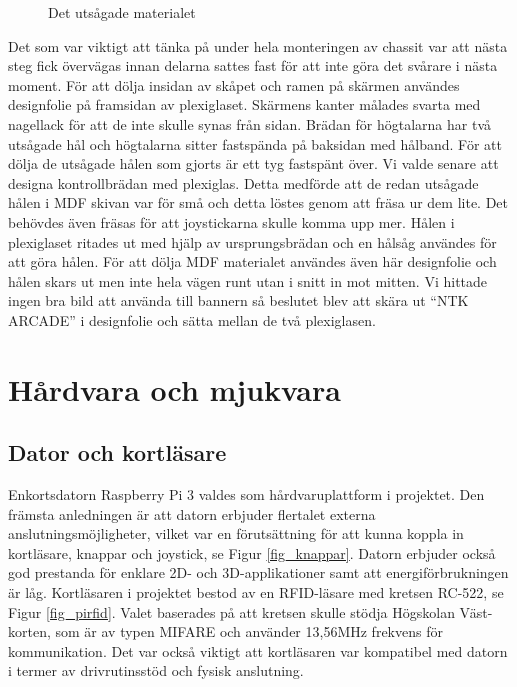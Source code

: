 \documentclass[12pt,fleqn,openany]{book} %
\begin{document}
\begin{wrapfigure}{R}{0.35\textwidth}
  \begin{center}
  \end{center}
  \vspace*{-0.6cm}
  \caption{Det utsågade materialet}
  \label{fig_material}
\end{wrapfigure}
\newpage
Det som var viktigt att tänka på under hela monteringen av chassit var att nästa steg fick övervägas innan delarna sattes fast 
för att inte göra det svårare i nästa moment. För att dölja insidan av skåpet och ramen på skärmen användes designfolie på framsidan 
av plexiglaset. Skärmens kanter målades svarta med nagellack för att de inte skulle synas från sidan. Brädan för högtalarna har två
utsågade hål och högtalarna sitter fastspända på baksidan med hålband. För att dölja de utsågade hålen som gjorts är ett tyg fastspänt
över. Vi valde senare att designa kontrollbrädan med plexiglas. Detta medförde att de redan utsågade hålen i MDF skivan var för små 
och detta löstes genom att fräsa ur dem lite. Det behövdes även fräsas för att joystickarna skulle komma upp mer. Hålen i plexiglaset
ritades ut med hjälp av ursprungsbrädan och en hålsåg användes för att göra hålen. För att dölja MDF materialet användes även här 
designfolie och hålen skars ut men inte hela vägen runt utan i snitt in mot mitten. Vi hittade ingen bra bild att använda till bannern 
så beslutet blev att skära ut “NTK ARCADE” i designfolie och sätta mellan de två plexiglasen.

\section{Hårdvara och mjukvara}
\subsection{Dator och kortläsare}
Enkortsdatorn Raspberry Pi 3 valdes som hårdvaruplattform i projektet. Den främsta anledningen är att datorn erbjuder flertalet
externa anslutningsmöjligheter, vilket var en förutsättning för att kunna koppla in kortläsare, knappar och joystick, se Figur \ref{fig_knappar}. Datorn 
erbjuder också god prestanda för enklare 2D- och 3D-applikationer samt att energiförbrukningen är låg. Kortläsaren i projektet 
bestod av en RFID-läsare med kretsen RC-522, se Figur \ref{fig_pirfid}. Valet baserades på att kretsen skulle stödja Högskolan Väst-korten, som är av typen 
MIFARE och använder 13,56MHz frekvens för kommunikation. Det var också viktigt att kortläsaren var kompatibel med datorn i termer 
av drivrutinsstöd och fysisk anslutning.
\end{document}
